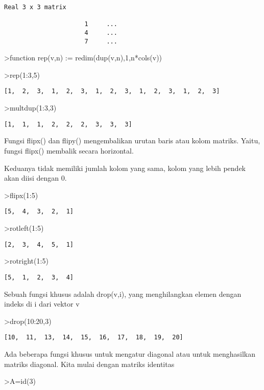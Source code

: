 \documentclass[
]{book}
\begin{document}
\begin{verbatim}
Real 3 x 3 matrix

                      1     ...
                      4     ...
                      7     ...
\end{verbatim}

\textgreater function rep(v,n) := redim(dup(v,n),1,n*cols(v))

\textgreater rep(1:3,5)

\begin{verbatim}
[1,  2,  3,  1,  2,  3,  1,  2,  3,  1,  2,  3,  1,  2,  3]
\end{verbatim}

\textgreater multdup(1:3,3)

\begin{verbatim}
[1,  1,  1,  2,  2,  2,  3,  3,  3]
\end{verbatim}

Fungsi flipx() dan flipy() mengembalikan urutan baris atau kolom matriks. Yaitu, fungsi flipx() membalik secara horizontal.

Keduanya tidak memiliki jumlah kolom yang sama, kolom yang lebih pendek akan diisi dengan 0.

\textgreater flipx(1:5)

\begin{verbatim}
[5,  4,  3,  2,  1]
\end{verbatim}

\textgreater rotleft(1:5)

\begin{verbatim}
[2,  3,  4,  5,  1]
\end{verbatim}

\textgreater rotright(1:5)

\begin{verbatim}
[5,  1,  2,  3,  4]
\end{verbatim}

Sebuah fungsi khusus adalah drop(v,i), yang menghilangkan elemen dengan indeks di i dari vektor v

\textgreater drop(10:20,3)

\begin{verbatim}
[10,  11,  13,  14,  15,  16,  17,  18,  19,  20]
\end{verbatim}

Ada beberapa fungsi khusus untuk mengatur diagonal atau untuk menghasilkan matriks diagonal. Kita mulai dengan matriks identitas

\textgreater A=id(3)
\end{document}
